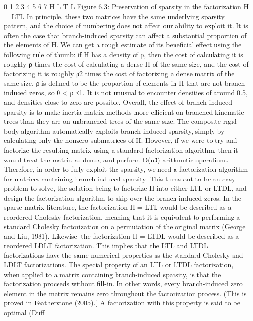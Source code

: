 0 1 2 3 4 5 6 7 H L T L Figure 6.3: Preservation of sparsity in the factorization H = LTL In principle, these two matrices have the same underlying sparsity pattern, and the choice of numbering does not affect our ability to exploit it. It is often the case that branch-induced sparsity can affect a substantial proportion of the elements of H. We can get a rough estimate of its beneficial effect using the following rule of thumb: if H has a density of ρ, then the cost of calculating it is roughly ρ times the cost of calculating a dense H of the same size, and the cost of factorizing it is roughly ρ2 times the cost of factorizing a dense matrix of the same size. ρ is defined to be the proportion of elements in H that are not branch-induced zeros, so 0 < ρ ≤1. It is not unusual to encounter densities of around 0.5, and densities close to zero are possible. Overall, the effect of branch-induced sparsity is to make inertia-matrix methods more efficient on branched kinematic trees than they are on unbranched trees of the same size. The composite-rigid-body algorithm automatically exploits branch-induced sparsity, simply by calculating only the nonzero submatrices of H. However, if we were to try and factorize the resulting matrix using a standard factorization algorithm, then it would treat the matrix as dense, and perform O(n3) arithmetic operations. Therefore, in order to fully exploit the sparsity, we need a factorization algorithm for matrices containing branch-induced sparsity. This turns out to be an easy problem to solve, the solution being to factorize H into either LTL or LTDL, and design the factorization algorithm to skip over the branch-induced zeros. In the sparse matrix literature, the factorization H = LTL would be described as a reordered Cholesky factorization, meaning that it is equivalent to performing a standard Cholesky factorization on a permutation of the original matrix (George and Liu, 1981). Likewise, the factorization H = LTDL would be described as a reordered LDLT factorization. This implies that the LTL and LTDL factorizations have the same numerical properties as the standard Cholesky and LDLT factorizations. The special property of an LTL or LTDL factorization, when applied to a matrix containing branch-induced sparsity, is that the factorization proceeds without fill-in. In other words, every branch-induced zero element in the matrix remains zero throughout the factorization process. (This is proved in Featherstone (2005).) A factorization with this property is said to be optimal (Duff

